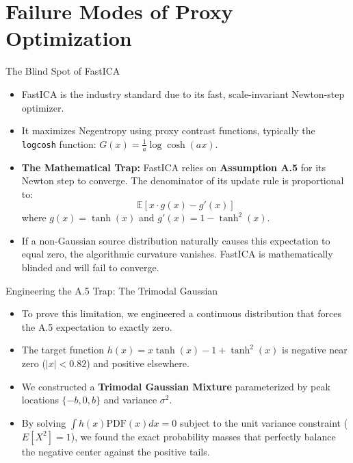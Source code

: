 \documentclass{beamer}
\begin{document}

\section{Failure Modes of Proxy Optimization}

\begin{frame}{The Blind Spot of FastICA}
  \begin{itemize}
    \item FastICA is the industry standard due to its fast, scale-invariant Newton-step optimizer.
    \item It maximizes Negentropy using proxy contrast functions, typically the \texttt{logcosh} function: $G(x) = \frac{1}{a} \log \cosh(ax)$.
    \item \textbf{The Mathematical Trap:} FastICA relies on \textbf{Assumption A.5} for its Newton step to converge. The denominator of its update rule is proportional to:
    \[
      \mathbb{E}[x \cdot g(x) - g'(x)] 
    \]
    where $g(x) = \tanh(x)$ and $g'(x) = 1 - \tanh^2(x)$.
    \item If a non-Gaussian source distribution naturally causes this expectation to equal zero, the algorithmic curvature vanishes. FastICA is mathematically blinded and will fail to converge.
  \end{itemize}
\end{frame}

\begin{frame}{Engineering the A.5 Trap: The Trimodal Gaussian}
  \begin{itemize}
    \item To prove this limitation, we engineered a continuous distribution that forces the A.5 expectation to exactly zero.
    \item The target function $h(x) = x \tanh(x) - 1 + \tanh^2(x)$ is negative near zero ($|x| < 0.82$) and positive elsewhere.
    \item We constructed a \textbf{Trimodal Gaussian Mixture} parameterized by peak locations $\{-b, 0, b\}$ and variance $\sigma^2$.
    \item By solving $\int h(x) \text{PDF}(x) dx = 0$ subject to the unit variance constraint ($E[X^2] = 1$), we found the exact probability masses that perfectly balance the negative center against the positive tails.
  \end{itemize}
\end{frame}
\end{document}
